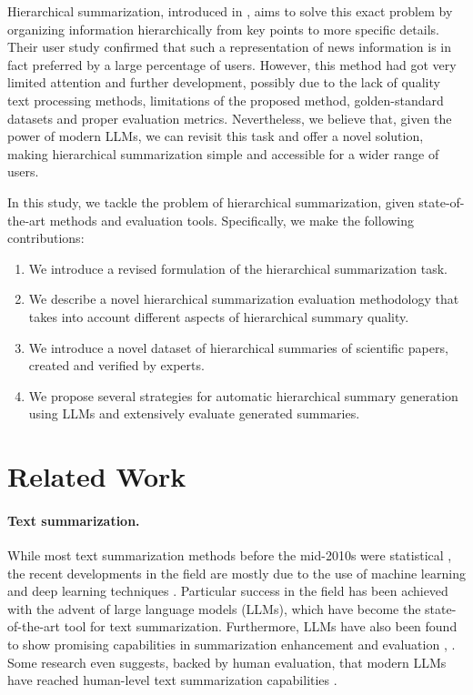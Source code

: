 \documentclass[11pt,a4paper]{article}
\begin{document}
Hierarchical summarization, introduced in \cite{christensen2014hierarchical}, aims to solve this exact problem by organizing information hierarchically from key points to more specific details. Their user study confirmed that such a representation of news information is in fact preferred by a large percentage of users. However, this method had got very limited attention and further development, possibly due to the lack of quality text processing methods, limitations of the proposed method, golden-standard datasets and proper evaluation metrics. Nevertheless, we believe that, given the power of modern LLMs, we can revisit this task and offer a novel solution, making hierarchical summarization simple and accessible for a wider range of users. 

In this study, we tackle the problem of hierarchical summarization, given state-of-the-art methods and evaluation tools. Specifically, we make the following contributions:
\begin{enumerate}
    \item We introduce a revised formulation of the hierarchical summarization task.
    \item We describe a novel hierarchical summarization evaluation methodology that takes into account different aspects of hierarchical summary quality.
    \item We introduce a novel dataset of hierarchical summaries of scientific papers, created and verified by experts.
    \item We propose several strategies for automatic hierarchical summary generation using LLMs and extensively evaluate generated summaries.
\end{enumerate}


\section{Related Work}

\paragraph{Text summarization.} While most text summarization methods before the mid-2010s were statistical \cite{gambhir2017recent}, the recent developments in the field are mostly due to the use of machine learning and deep learning techniques \cite{el2021automatic, zhang2025comprehensive}. Particular success in the field has been achieved with the advent of large language models (LLMs), which have become the state-of-the-art tool for text summarization. Furthermore, LLMs have also been found to show promising capabilities in summarization enhancement and evaluation \cite{wu2023large}, \cite{liu2023g}. Some research even suggests, backed by human evaluation, that modern LLMs have reached human-level text summarization capabilities \cite{pu2023summarization}. 
\end{document}
